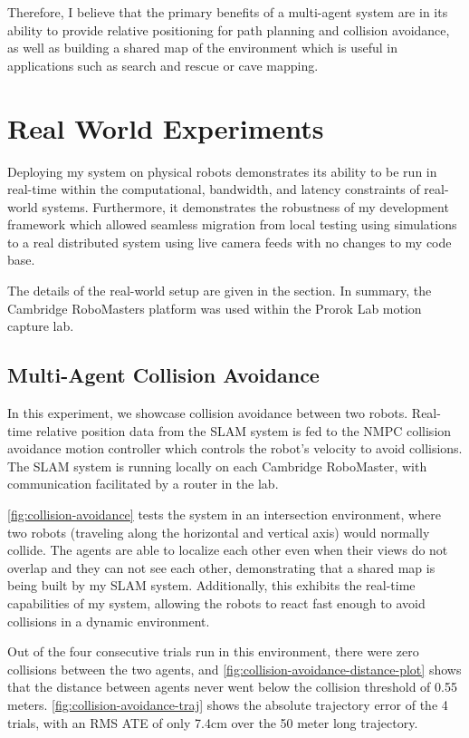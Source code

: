 Therefore, I believe that the primary benefits of a multi-agent system are in its ability to provide relative positioning for path planning and collision avoidance, as well as building a shared map of the environment which is useful in applications such as search and rescue or cave mapping.


\section{Real World Experiments}
\label{sec:real-world-experiments}
Deploying my system on physical robots demonstrates its ability to be run in real-time within the computational, bandwidth, and latency constraints of real-world systems. Furthermore, it demonstrates the robustness of my development framework which allowed seamless migration from local testing using simulations to a real distributed system using live camera feeds with no changes to my code base.

The details of the real-world setup are given in the  section. In summary, the Cambridge RoboMasters platform was used within the Prorok Lab motion capture lab.

\subsection{Multi-Agent Collision Avoidance}
\label{sec:multi-agent-collision-avoidance}
In this experiment, we showcase collision avoidance between two robots. Real-time relative position data from the SLAM system is fed to the NMPC collision avoidance motion controller which controls the robot's velocity to avoid collisions. The SLAM system is running locally on each Cambridge RoboMaster, with communication facilitated by a router in the lab.

\autoref{fig:collision-avoidance} tests the system in an intersection environment, where two robots (traveling along the horizontal and vertical axis) would normally collide. The agents are able to localize each other even when their views do not overlap and they can not see each other, demonstrating that a shared map is being built by my SLAM system. Additionally, this exhibits the real-time capabilities of my system, allowing the robots to react fast enough to avoid collisions in a dynamic environment.

Out of the four consecutive trials run in this environment, there were zero collisions between the two agents, and \autoref{fig:collision-avoidance-distance-plot} shows that the distance between agents never went below the collision threshold of 0.55 meters. \autoref{fig:collision-avoidance-traj} shows the absolute trajectory error of the 4 trials, with an RMS ATE of only 7.4cm over the 50 meter long trajectory.


